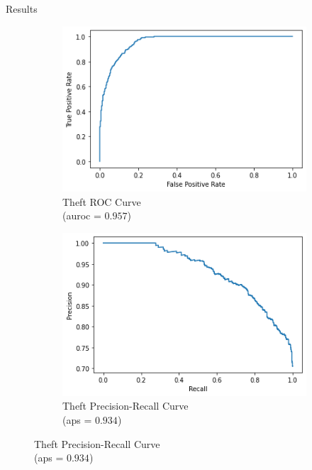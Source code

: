 \documentclass[10pt]{beamer}
\begin{document}
\begin{frame}{Results}
\begin{figure}
\begin{subfigure}{.5\textwidth}
  \centering
  \includegraphics[width=0.7\linewidth]{ROC_theft.png}
  \caption{Theft ROC Curve \\
  (auroc = $0.957$)}
  \label{fig:sub1}
\end{subfigure}%
\begin{subfigure}{.5\textwidth}
  \centering
  \includegraphics[width=0.7\linewidth]{PRC_theft.png}
  \caption{Theft Precision-Recall Curve \\
  (aps = $0.934$)}
  \label{fig:sub2}
\end{subfigure}
\label{fig:test}
\end{figure}
\end{frame}
\end{document}
